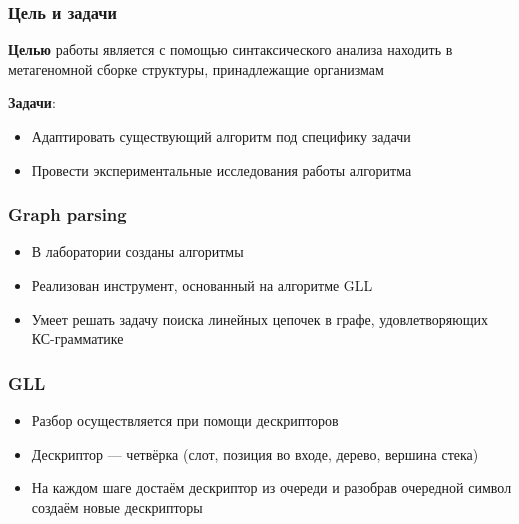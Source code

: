 \documentclass{beamer}
\begin{document}
\begin{frame}
    \frametitle{Цель и задачи}
    \textbf{Целью} работы является с помощью синтаксического анализа находить в метагеномной сборке структуры, принадлежащие организмам
    
    \textbf{Задачи}:
    \begin{itemize}
        \item Адаптировать существующий алгоритм под специфику задачи
        \item Провести экспериментальные исследования работы алгоритма
    \end{itemize}
\end{frame}

\begin{frame}
    \frametitle{Graph parsing}
    \begin{itemize}
        \item В лаборатории созданы алгоритмы
        \item Реализован инструмент, основанный на алгоритме GLL
        \item Умеет решать задачу поиска линейных цепочек в графе, удовлетворяющих КС-грамматике
    \end{itemize}
\end{frame}

\begin{frame}
	\frametitle{GLL}
	\begin{itemize}
		\item Разбор осуществляется при помощи дескрипторов
        \item Дескриптор --- четвёрка (слот, позиция во входе, дерево, вершина стека)
		\item На каждом шаге достаём дескриптор из очереди и разобрав очередной символ создаём новые дескрипторы
	\end{itemize}
\end{frame}
\end{document}
